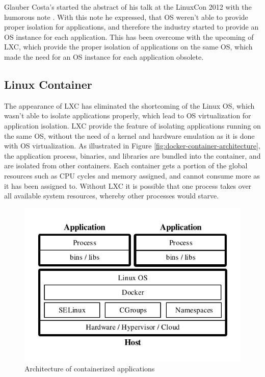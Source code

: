 Glauber Costa's started the abstract of his talk at the LinuxCon 2012 with the humorous note . With this note he expressed, that OS weren't able to provide proper isolation for applications, and therefore the industry started to provide an OS instance for each application. This has been overcome with the upcoming of LXC, which provide the proper isolation of applications on the same OS, which made the need for an OS instance for each application obsolete\cite{LxConCosta2012}.

\subsection{Linux Container}
\label{sec:docker-linux-container}
The appearance of LXC has eliminated the shortcoming of the Linux OS, which wasn't able to isolate applications properly, which lead to OS virtualization for application isolation. LXC provide the feature of isolating applications running on the same OS, without the need of a kernel and hardware emulation as it is done with OS virtualization. As illustrated in Figure \vref{fig:docker-container-architecture}, the application process, binaries, and libraries are bundled into the container, and are isolated from other containers. Each container gets a portion of the global resources such as CPU cycles and memory assigned, and cannot consume more as it has been assigned to. Without LXC it is possible that one process takes over all available system resources, whereby other processes would starve.

\begin{figure}[htbp]
	\centering
	\includegraphics[scale=1]{images/docker-containerized-architecture.pdf}
	\caption{Architecture of containerized applications}
	\label{fig:docker-container-architecture}
\end{figure} 

